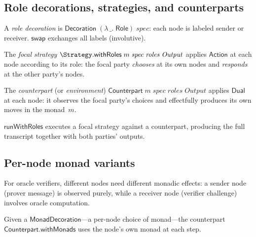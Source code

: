 \subsection{Role decorations, strategies, and counterparts}

\begin{definition}[RoleDecoration]
  \label{int:role-decoration}
  A \emph{role decoration} is $\mathsf{Decoration}\;(\lambda\,\_.\;
  \mathsf{Role})\;\mathit{spec}$: each node is labeled sender or receiver.
  $\mathsf{swap}$ exchanges all labels (involutive).
\end{definition}

\begin{definition}
  \label{int:strategy-with-roles}
  The \emph{focal strategy} $\Strategy.\mathsf{withRoles}\;m\;\mathit{spec}\;
  \mathit{roles}\;\mathit{Output}$ applies $\mathsf{Action}$ at each node
  according to its role: the focal party \emph{chooses} at its own nodes and
  \emph{responds} at the other party's nodes.
\end{definition}

\begin{definition}[Counterpart]
  \label{int:counterpart}
  The \emph{counterpart} (or \emph{environment}) $\mathsf{Counterpart}\;m\;
  \mathit{spec}\;\mathit{roles}\;\mathit{Output}$ applies $\mathsf{Dual}$ at
  each node: it observes the focal party's choices and effectfully produces its
  own moves in the monad~$m$.
\end{definition}

$\mathsf{runWithRoles}$ executes a focal strategy against a counterpart,
producing the full transcript together with both parties' outputs.

\subsection{Per-node monad variants}

For oracle verifiers, different nodes need different monadic effects: a sender
node (prover message) is observed purely, while a receiver node (verifier
challenge) involves oracle computation.

\begin{definition}
  \label{int:counterpart-with-monads}
  Given a $\mathsf{MonadDecoration}$---a per-node choice of monad---the
  counterpart $\mathsf{Counterpart.withMonads}$ uses the node's own monad at
  each step.
\end{definition}

